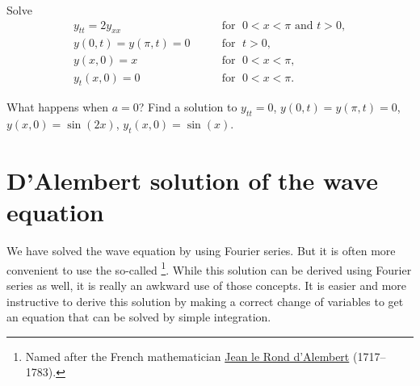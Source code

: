\begin{exercise}
Solve
\begin{equation*}
\begin{array}{ll}
y_{tt} = 2 y_{xx} & \qquad \text{for } \; 0 < x < \pi \text{ and } t > 0,  \\
y(0,t) = y(\pi,t) = 0 & \qquad \text{for } \; t > 0 , \\
y(x,0) = x & \qquad \text{for } \; 0 < x < \pi , \\
y_t(x,0) = 0 & \qquad \text{for } \; 0 < x < \pi .
\end{array}
\end{equation*}
\end{exercise}
\exsol{%
$
y(x,t)
=
\sum\limits_{n=1}^\infty
\frac{2{(-1)}^{n+1}}{n}
\sin(nx)
\cos( n \sqrt{2}\,t ) 
$
}

\begin{exercise}
What happens when $a=0$?  Find a solution to
$y_{tt} = 0$, $y(0,t) = y(\pi,t) = 0$,
$y(x,0) = \sin(2x)$,
$y_t(x,0) = \sin(x)$.
\end{exercise}


\sectionnewpage
\section{D'Alembert solution of the wave equation}
\label{dalemb:section}



We have solved the wave equation by using Fourier series.  But it is often
more convenient to use the so-called
\emph{}%
\footnote{Named after the French mathematician
\href{https://en.wikipedia.org/wiki/D\%27Alembert}{Jean le Rond d'Alembert}
(1717--1783).}.
While this solution can be derived using Fourier series as well, it
is really an awkward use of those concepts.  It is easier and more
instructive to derive this
solution by making a correct change of variables to get an equation that
can be solved by simple integration.

